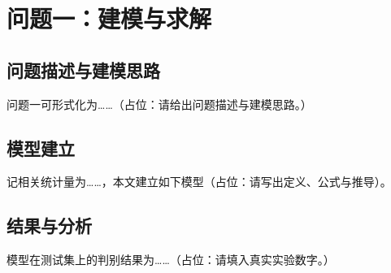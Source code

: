 \section{问题一：建模与求解}

\subsection{问题描述与建模思路}
问题一可形式化为……（占位：请给出问题描述与建模思路。）

\subsection{模型建立}
记相关统计量为……，本文建立如下模型（占位：请写出定义、公式与推导）。

\subsection{结果与分析}
模型在测试集上的判别结果为……（占位：请填入真实实验数字。）
